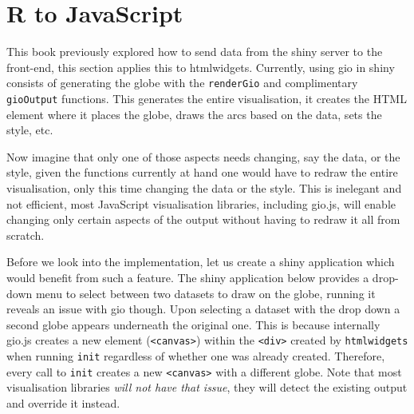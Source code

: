 \documentclass[
]{krantz}
\begin{document}
\hypertarget{r-to-javascript}{%
\section{R to JavaScript}\label{r-to-javascript}}

This book previously explored how to send data from the shiny server to the front-end, this section applies this to htmlwidgets. Currently, using gio in shiny consists of generating the globe with the \texttt{renderGio} and complimentary \texttt{gioOutput} functions. This generates the entire visualisation, it creates the HTML element where it places the globe, draws the arcs based on the data, sets the style, etc.

Now imagine that only one of those aspects needs changing, say the data, or the style, given the functions currently at hand one would have to redraw the entire visualisation, only this time changing the data or the style. This is inelegant and not efficient, most JavaScript visualisation libraries, including gio.js, will enable changing only certain aspects of the output without having to redraw it all from scratch.

Before we look into the implementation, let us create a shiny application which would benefit from such a feature. The shiny application below provides a drop-down menu to select between two datasets to draw on the globe, running it reveals an issue with gio though. Upon selecting a dataset with the drop down a second globe appears underneath the original one. This is because internally gio.js creates a new element (\texttt{\textless{}canvas\textgreater{}}) within the \texttt{\textless{}div\textgreater{}} created by \texttt{htmlwidgets} when running \texttt{init} regardless of whether one was already created. Therefore, every call to \texttt{init} creates a new \texttt{\textless{}canvas\textgreater{}} with a different globe. Note that most visualisation libraries \emph{will not have that issue}, they will detect the existing output and override it instead.
\end{document}
